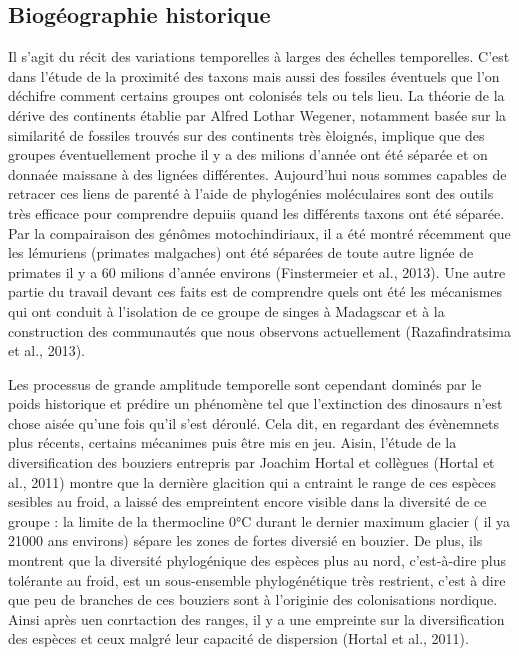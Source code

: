 \subsection*{Biogéographie
historique}\label{bioguxe9ographie-historique}

Il s'agit du récit des variations temporelles à larges des échelles
temporelles. C'est dans l'étude de la proximité des taxons mais aussi
des fossiles éventuels que l'on déchifre comment certains groupes ont
colonisés tels ou tels lieu. La théorie de la dérive des continents
établie par Alfred Lothar Wegener, notamment basée sur la similarité de
fossiles trouvés sur des continents très èloignés, implique que des
groupes éventuellement proche il y a des milions d'année ont été séparée
et on donnaée maissane à des lignées différentes. Aujourd'hui nous
sommes capables de retracer ces liens de parenté à l'aide de phylogénies
moléculaires sont des outils très efficace pour comprendre depuiis quand
les différents taxons ont été séparée. Par la compairaison des génômes
motochindiriaux, il a été montré récemment que les lémuriens (primates
malgaches) ont été séparées de toute autre lignée de primates il y a 60
milions d'année environs (Finstermeier et al., 2013). Une autre partie
du travail devant ces faits est de comprendre quels ont été les
mécanismes qui ont conduit à l'isolation de ce groupe de singes à
Madagscar et à la construction des communautés que nous observons
actuellement (Razafindratsima et al., 2013).

Les processus de grande amplitude temporelle sont cependant dominés par
le poids historique et prédire un phénomène tel que l'extinction des
dinosaurs n'est chose aisée qu'une fois qu'il s'est déroulé. Cela dit,
en regardant des évènemnets plus récents, certains mécanimes puis être
mis en jeu. Aisin, l'étude de la diversification des bouziers entrepris
par Joachim Hortal et collègues (Hortal et al., 2011) montre que la
dernière glacition qui a cntraint le range de ces espèces sesibles au
froid, a laissé des empreintent encore visible dans la diversité de ce
groupe : la limite de la thermocline 0°C durant le dernier maximum
glacier ( il ya 21000 ans environs) sépare les zones de fortes diversié
en bouzier. De plus, ils montrent que la diversité phylogénique des
espèces plus au nord, c'est-à-dire plus tolérante au froid, est un
sous-ensemble phylogénétique très restrient, c'est à dire que peu de
branches de ces bouziers sont à l'originie des colonisations nordique.
Ainsi après uen conrtaction des ranges, il y a une empreinte sur la
diversification des espèces et ceux malgré leur capacité de dispersion
(Hortal et al., 2011).

